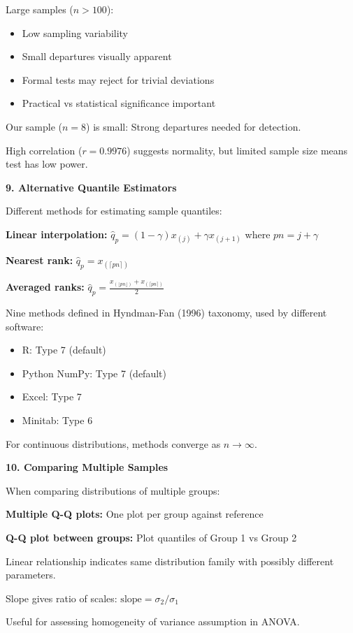 \documentclass[12pt]{article}
\begin{document}
\begin{explanation}
Large samples ($n > 100$):
\begin{itemize}
\item Low sampling variability
\item Small departures visually apparent
\item Formal tests may reject for trivial deviations
\item Practical vs statistical significance important
\end{itemize}

Our sample ($n=8$) is small: Strong departures needed for detection.

High correlation ($r = 0.9976$) suggests normality, but limited sample size means test has low power.

\textbf{9. Alternative Quantile Estimators}

Different methods for estimating sample quantiles:

\textbf{Linear interpolation:} $\hat{q}_p = (1-\gamma)x_{(j)} + \gamma x_{(j+1)}$ where $p n = j + \gamma$

\textbf{Nearest rank:} $\hat{q}_p = x_{(\lceil p n \rceil)}$

\textbf{Averaged ranks:} $\hat{q}_p = \frac{x_{(\lfloor p n \rfloor)} + x_{(\lceil p n \rceil)}}{2}$

Nine methods defined in Hyndman-Fan (1996) taxonomy, used by different software:
\begin{itemize}
\item R: Type 7 (default)
\item Python NumPy: Type 7 (default)
\item Excel: Type 7
\item Minitab: Type 6
\end{itemize}

For continuous distributions, methods converge as $n \to \infty$.

\textbf{10. Comparing Multiple Samples}

When comparing distributions of multiple groups:

\textbf{Multiple Q-Q plots:} One plot per group against reference

\textbf{Q-Q plot between groups:} Plot quantiles of Group 1 vs Group 2

Linear relationship indicates same distribution family with possibly different parameters.

Slope gives ratio of scales: $\text{slope} = \sigma_2/\sigma_1$

Useful for assessing homogeneity of variance assumption in ANOVA.


\end{explanation}
\end{document}
